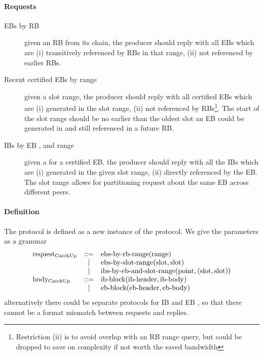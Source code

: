 \paragraph{Requests}
\begin{description}
\item[EBs by RB \rbrange{}] given an RB \rbrange{} from its chain, the producer
  should reply with all EBs which are (i) transitively referenced by RBs in that
  range, (ii) not referenced by earlier RBs.
\item[Recent certified EBs by \slot{} range] given a slot range, the
  producer should reply with all certified EBs which are (i) generated
  in the slot range, (ii) not referenced by RBs\footnote{Restriction
  (ii) is to avoid overlap with an RB range query, but could be dropped to save on complexity if not worth the saved bandwidth}. The start of the
  slot range should be no earlier than the oldest slot an EB could be
  generated in and still referenced in a future RB.
\item[IBs by EB \point{}, and \slot{} range] given a \point{} for a
  certified EB, the producer should reply with all the IBs which are (i)
  generated in the given slot range, (ii) directly referenced by
  the EB. The slot range allows for partitioning request about the
  same EB across different peers.
\end{description}

\paragraph{Definition} The \catchup{} protocol is defined as a new instance of the \fetch{} protocol. We give the parameters as a grammar
\[
\begin{array}{l c l l}
\text{request}{}_{\text{CatchUp}{}} & ::= & \text{ebs-by-rb-range}(\text{range}{})\\
       & \mid  & \text{ebs-by-slot-range}(\text{slot}{},\text{slot}{})\\
       & \mid  & \text{ibs-by-eb-and-slot-range}(\text{point}{},(\text{slot}{},\text{slot}{}))\\
\text{body}{}_{\text{CatchUp}{}} & ::= & \text{ib-block}(\text{ib-header},\text{ib-body}) \\
        & \mid & \text{eb-block}(\text{eb-header}, \text{eb-body})\\
\end{array}
\]
alternatively there could be separate protocols for IB and EB \catchup{}, so that there cannot be a format mismatch between requests and replies.
